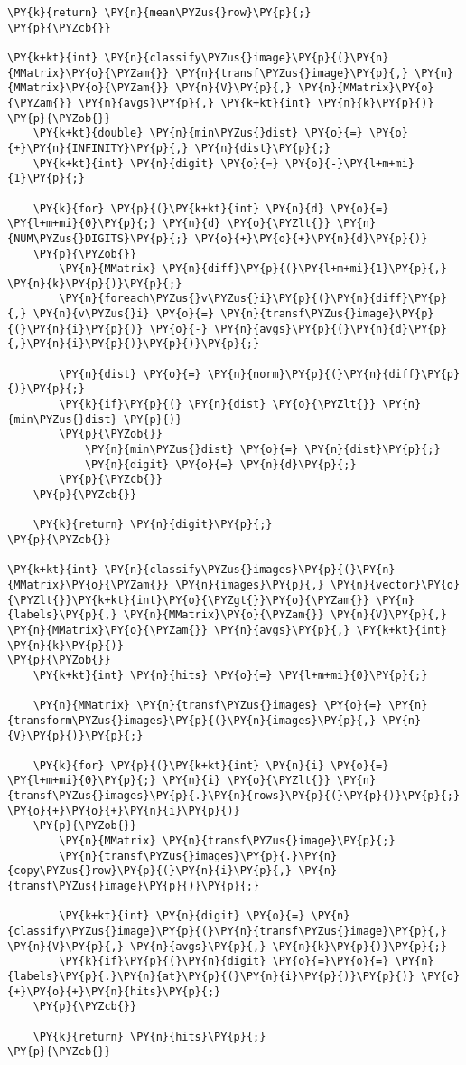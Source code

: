 \begin{Verbatim}[commandchars=\\\{\}]
	\PY{k}{return} \PY{n}{mean\PYZus{}row}\PY{p}{;}
\PY{p}{\PYZcb{}}

\PY{k+kt}{int} \PY{n}{classify\PYZus{}image}\PY{p}{(}\PY{n}{MMatrix}\PY{o}{\PYZam{}} \PY{n}{transf\PYZus{}image}\PY{p}{,} \PY{n}{MMatrix}\PY{o}{\PYZam{}} \PY{n}{V}\PY{p}{,} \PY{n}{MMatrix}\PY{o}{\PYZam{}} \PY{n}{avgs}\PY{p}{,} \PY{k+kt}{int} \PY{n}{k}\PY{p}{)}
\PY{p}{\PYZob{}}
	\PY{k+kt}{double} \PY{n}{min\PYZus{}dist} \PY{o}{=} \PY{o}{+}\PY{n}{INFINITY}\PY{p}{,} \PY{n}{dist}\PY{p}{;}
	\PY{k+kt}{int} \PY{n}{digit} \PY{o}{=} \PY{o}{-}\PY{l+m+mi}{1}\PY{p}{;}

	\PY{k}{for} \PY{p}{(}\PY{k+kt}{int} \PY{n}{d} \PY{o}{=} \PY{l+m+mi}{0}\PY{p}{;} \PY{n}{d} \PY{o}{\PYZlt{}} \PY{n}{NUM\PYZus{}DIGITS}\PY{p}{;} \PY{o}{+}\PY{o}{+}\PY{n}{d}\PY{p}{)}
	\PY{p}{\PYZob{}}
		\PY{n}{MMatrix} \PY{n}{diff}\PY{p}{(}\PY{l+m+mi}{1}\PY{p}{,} \PY{n}{k}\PY{p}{)}\PY{p}{;}
		\PY{n}{foreach\PYZus{}v\PYZus{}i}\PY{p}{(}\PY{n}{diff}\PY{p}{,} \PY{n}{v\PYZus{}i} \PY{o}{=} \PY{n}{transf\PYZus{}image}\PY{p}{(}\PY{n}{i}\PY{p}{)} \PY{o}{-} \PY{n}{avgs}\PY{p}{(}\PY{n}{d}\PY{p}{,}\PY{n}{i}\PY{p}{)}\PY{p}{)}\PY{p}{;}

		\PY{n}{dist} \PY{o}{=} \PY{n}{norm}\PY{p}{(}\PY{n}{diff}\PY{p}{)}\PY{p}{;}
		\PY{k}{if}\PY{p}{(} \PY{n}{dist} \PY{o}{\PYZlt{}} \PY{n}{min\PYZus{}dist} \PY{p}{)}
		\PY{p}{\PYZob{}}
			\PY{n}{min\PYZus{}dist} \PY{o}{=} \PY{n}{dist}\PY{p}{;}
			\PY{n}{digit} \PY{o}{=} \PY{n}{d}\PY{p}{;}
		\PY{p}{\PYZcb{}}
	\PY{p}{\PYZcb{}}

	\PY{k}{return} \PY{n}{digit}\PY{p}{;}
\PY{p}{\PYZcb{}}

\PY{k+kt}{int} \PY{n}{classify\PYZus{}images}\PY{p}{(}\PY{n}{MMatrix}\PY{o}{\PYZam{}} \PY{n}{images}\PY{p}{,} \PY{n}{vector}\PY{o}{\PYZlt{}}\PY{k+kt}{int}\PY{o}{\PYZgt{}}\PY{o}{\PYZam{}} \PY{n}{labels}\PY{p}{,} \PY{n}{MMatrix}\PY{o}{\PYZam{}} \PY{n}{V}\PY{p}{,} \PY{n}{MMatrix}\PY{o}{\PYZam{}} \PY{n}{avgs}\PY{p}{,} \PY{k+kt}{int} \PY{n}{k}\PY{p}{)}
\PY{p}{\PYZob{}}
	\PY{k+kt}{int} \PY{n}{hits} \PY{o}{=} \PY{l+m+mi}{0}\PY{p}{;}

	\PY{n}{MMatrix} \PY{n}{transf\PYZus{}images} \PY{o}{=} \PY{n}{transform\PYZus{}images}\PY{p}{(}\PY{n}{images}\PY{p}{,} \PY{n}{V}\PY{p}{)}\PY{p}{;}

	\PY{k}{for} \PY{p}{(}\PY{k+kt}{int} \PY{n}{i} \PY{o}{=} \PY{l+m+mi}{0}\PY{p}{;} \PY{n}{i} \PY{o}{\PYZlt{}} \PY{n}{transf\PYZus{}images}\PY{p}{.}\PY{n}{rows}\PY{p}{(}\PY{p}{)}\PY{p}{;} \PY{o}{+}\PY{o}{+}\PY{n}{i}\PY{p}{)}
	\PY{p}{\PYZob{}}
		\PY{n}{MMatrix} \PY{n}{transf\PYZus{}image}\PY{p}{;}
		\PY{n}{transf\PYZus{}images}\PY{p}{.}\PY{n}{copy\PYZus{}row}\PY{p}{(}\PY{n}{i}\PY{p}{,} \PY{n}{transf\PYZus{}image}\PY{p}{)}\PY{p}{;}

		\PY{k+kt}{int} \PY{n}{digit} \PY{o}{=} \PY{n}{classify\PYZus{}image}\PY{p}{(}\PY{n}{transf\PYZus{}image}\PY{p}{,} \PY{n}{V}\PY{p}{,} \PY{n}{avgs}\PY{p}{,} \PY{n}{k}\PY{p}{)}\PY{p}{;}
		\PY{k}{if}\PY{p}{(}\PY{n}{digit} \PY{o}{=}\PY{o}{=} \PY{n}{labels}\PY{p}{.}\PY{n}{at}\PY{p}{(}\PY{n}{i}\PY{p}{)}\PY{p}{)} \PY{o}{+}\PY{o}{+}\PY{n}{hits}\PY{p}{;}
	\PY{p}{\PYZcb{}}

	\PY{k}{return} \PY{n}{hits}\PY{p}{;}
\PY{p}{\PYZcb{}}
\end{Verbatim}
